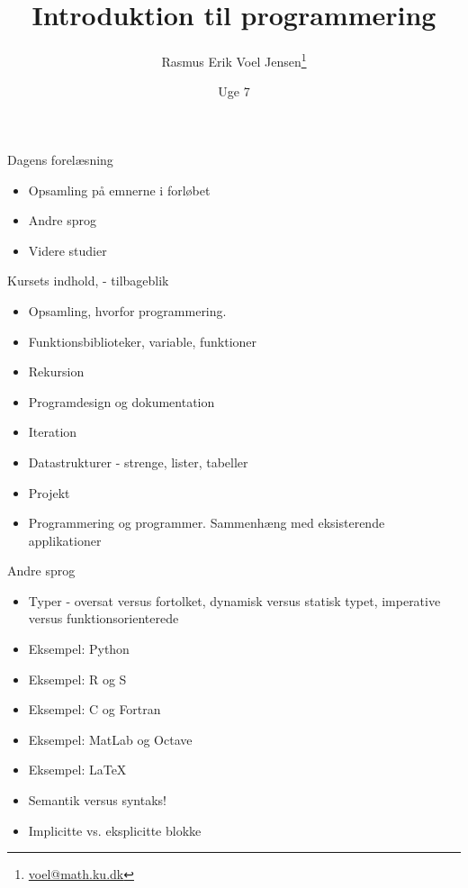 \documentclass[a4paper,landscape]{slides}
\title{Introduktion til programmering}
\author{Rasmus Erik Voel Jensen\footnote{\url{voel@math.ku.dk}}}
\date{Uge 7}
\begin{document}
\maketitle


\begin{slide}
	\begin{center} {\large 
		Dagens forelæsning
	} \end{center}
	\begin{itemize} \addtolength{\itemsep}{-\baselineskip}
    		\item Opsamling på emnerne i forløbet
    		\item Andre sprog
    		\item Videre studier
	\end{itemize}
\end{slide}


\begin{slide}
	\begin{center} {\large 
		Kursets indhold, - tilbageblik
	} \end{center}
	\begin{itemize} \addtolength{\itemsep}{-\baselineskip}
		\item Opsamling, hvorfor programmering.
		\item Funktionsbiblioteker, variable, funktioner
		\item Rekursion
		\item Programdesign og dokumentation
		\item Iteration
		\item Datastrukturer - strenge, lister, tabeller
		\item Projekt 
		\item Programmering og programmer. Sammenhæng med eksisterende applikationer
	\end{itemize}
\end{slide}


\begin{slide}
	\begin{center} {\large 
		Andre sprog
	} \end{center}
	\begin{itemize} \addtolength{\itemsep}{-\baselineskip}
		\item Typer - oversat versus fortolket, dynamisk versus statisk typet, imperative versus funktionsorienterede
		\item Eksempel: Python
		\item Eksempel: R og S
		\item Eksempel: C og Fortran
		\item Eksempel: MatLab og Octave
		\item Eksempel: \LaTeX
		\item Semantik versus syntaks!
		\item Implicitte vs. eksplicitte blokke
	\end{itemize}
\end{slide}
\end{document}
